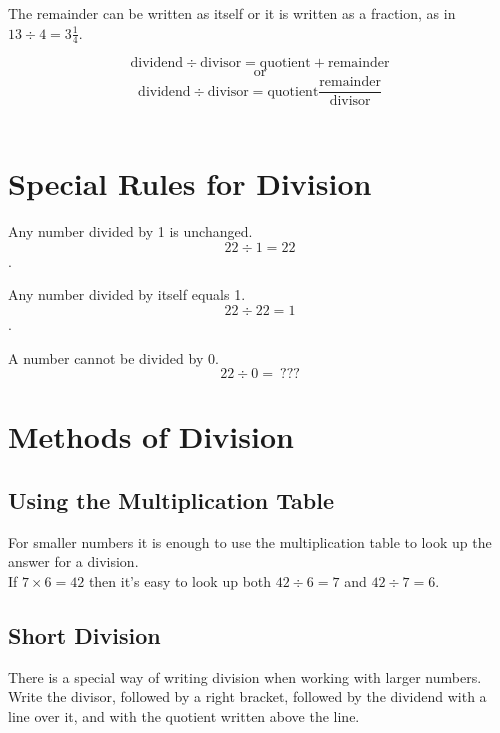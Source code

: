 \documentclass{article}
\begin{document}
The remainder can be written as itself or it is written as a fraction, as in $13 \div 4 = 3 \frac{1}{4}$.

$$\textrm{dividend} \div \textrm{divisor} = \textrm{quotient} + \textrm{remainder}$$
$$\textrm{or}$$
$$\textrm{dividend} \div \textrm{divisor} = \textrm{quotient} \frac{\textrm{remainder}}{\textrm{divisor}}$$\\

\pagebreak

\section{Special Rules for Division}
\vspace{16pt}

Any number divided by 1 is unchanged.\\

$$22 \div 1 = 22$$.

Any number divided by itself equals 1.\\

$$22 \div 22 = 1$$.

A number cannot be divided by 0.\\

$$22 \div 0 = \ ???$$

\pagebreak

\section{Methods of Division}
\vspace{16pt}

\subsection*{Using the Multiplication Table}

For smaller numbers it is enough to use the multiplication table to look up the answer for a division.\\

If $7 \times 6 = 42$ then it's easy to look up both $42 \div 6 = 7$ and $42 \div 7 = 6$.\\

\pagebreak

\subsection*{Short Division}
There is a special way of writing division when working with larger numbers. Write the divisor, followed by a right bracket, followed by the dividend with a line over it, and with the quotient written above the line.
\end{document}
